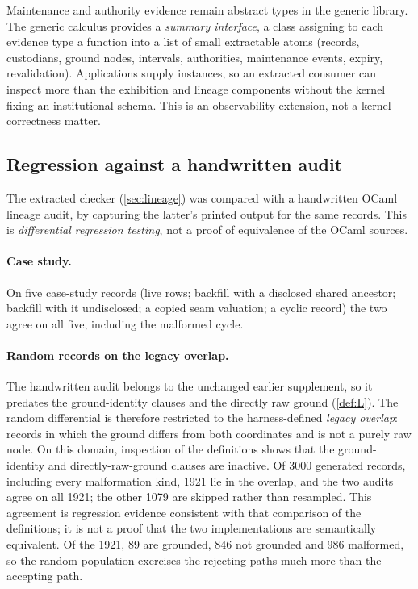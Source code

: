 Maintenance and authority evidence remain abstract types in the generic library. The generic calculus provides a \emph{summary interface}, a class assigning to each evidence type a function into a list of small extractable atoms (records, custodians, ground nodes, intervals, authorities, maintenance events, expiry, revalidation). Applications supply instances, so an extracted consumer can inspect more than the exhibition and lineage components without the kernel fixing an institutional schema. This is an observability extension, not a kernel correctness matter.

\subsection{Regression against a handwritten audit}\label{sec:regression}
The extracted checker (\cref{sec:lineage}) was compared with a handwritten OCaml lineage audit, by capturing the latter's printed output for the same records. This is \emph{differential regression testing}, not a proof of equivalence of the OCaml sources.

\paragraph{Case study.}
On five case-study records (live rows; backfill with a disclosed shared ancestor; backfill with it undisclosed; a copied seam valuation; a cyclic record) the two agree on all five, including the malformed cycle.

\paragraph{Random records on the legacy overlap.}
The handwritten audit belongs to the unchanged earlier supplement, so it predates the ground-identity clauses and the directly raw ground (\cref{def:L}). The random differential is therefore restricted to the harness-defined \emph{legacy overlap}: records in which the ground differs from both coordinates and is not a purely raw node. On this domain, inspection of the definitions shows that the ground-identity and directly-raw-ground clauses are inactive. Of 3000 generated records, including every malformation kind, 1921 lie in the overlap, and the two audits agree on all 1921; the other 1079 are skipped rather than resampled. This agreement is regression evidence consistent with that comparison of the definitions; it is not a proof that the two implementations are semantically equivalent. Of the 1921, 89 are grounded, 846 not grounded and 986 malformed, so the random population exercises the rejecting paths much more than the accepting path.


